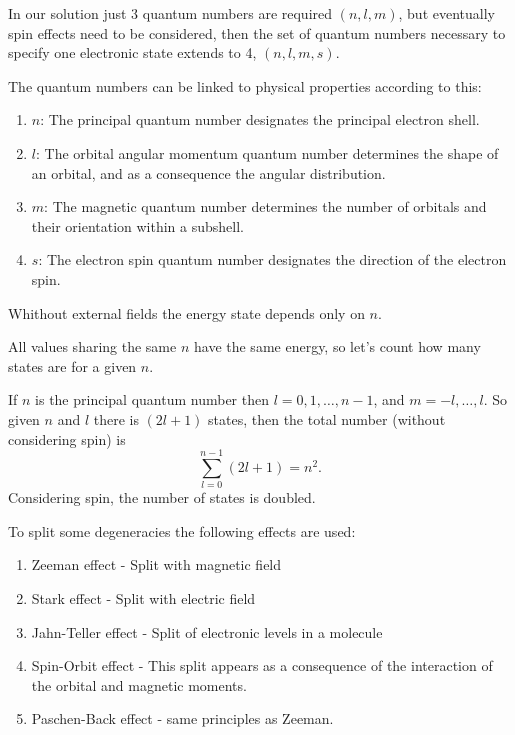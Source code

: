 \begin{questions}
\begin{solution}
  In our solution just 3 quantum numbers are required $(n,l,m)$, but eventually spin effects need to be considered, then the set of quantum numbers necessary to specify one electronic state extends to 4, $(n,l,m,s)$.

  The quantum numbers can be linked to physical properties according to this:

  \begin{enumerate}
    \item $n$: The principal quantum number designates the principal electron shell.
    \item $l$: The orbital angular momentum quantum number determines the shape of an orbital, and as a consequence the angular distribution.
    \item $m$: The magnetic quantum number determines the number of orbitals and their orientation within a subshell.
    \item $s$: The electron spin quantum number designates the direction of the electron spin.
  \end{enumerate}

  Whithout external fields the energy state depends only on $n$.
\end{solution}

\begin{solution}

    All values sharing the same $n$ have the same energy, so let's count how many states are for a given $n$.

  If $n$ is the principal quantum number then $l = 0, 1,\ldots, n-1$, and $m = -l,\ldots, l$. So given $n$ and $l$ there is $(2l+1)$ states, then the total number (without considering spin) is
  \begin{equation}
    \sum_{l=0}^{n-1} (2l+1) = n^2.
  \end{equation}
  Considering spin, the number of states is doubled.

  To split some degeneracies the following effects are used:
  \begin{enumerate}
    \item Zeeman effect - Split with magnetic field
    \item Stark effect - Split with electric field
    \item Jahn-Teller effect - Split of electronic levels in a molecule
    \item Spin-Orbit effect - This split appears as a consequence of the interaction of the orbital and magnetic moments.
    \item Paschen-Back effect - same principles as Zeeman. 
  \end{enumerate}
\end{solution}
\end{questions}
